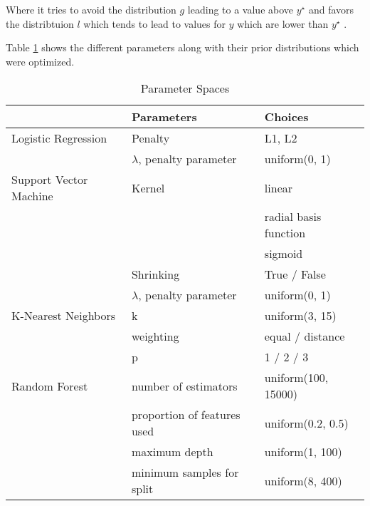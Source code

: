 Where it tries to avoid the distribution $g$ leading to a value above $y^\star$ and favors the distribtuion $l$ which tends to lead to values for $y$ which are lower than $y^\star$ \cite{tpe}.

Table \ref{spaces} shows the different parameters along with their prior distributions which were optimized.

\begin{table}
\centering
\caption{Parameter Spaces}
\label{spaces}
\tiny
\begin{tabular}{lll}
                            & Parameters                  & Choices                                \\ \hline
Logistic Regression         & Penalty                     & L1, L2                                 \\
                            & $\lambda$, penalty parameter       & uniform(0, 1)                          \\
Support Vector Machine      & Kernel                      & linear \\
                            &                             & radial basis function\\
                            &                             &  sigmoid \\
                            & Shrinking                   & True / False                           \\
                            & $\lambda$, penalty parameter                      & uniform(0, 1)                          \\
K-Nearest Neighbors         & k                           & uniform(3, 15)                         \\
                            & weighting                   & equal / distance                       \\
                            & p                           & 1  / 2 / 3                             \\
Random Forest               & number of estimators        & uniform(100, 15000)                    \\
                            & proportion of features used & uniform(0.2, 0.5)                      \\
                            & maximum depth               & uniform(1, 100)                        \\
                            & minimum samples for split   & uniform(8, 400)                        \\

\end{tabular}
\end{table}
